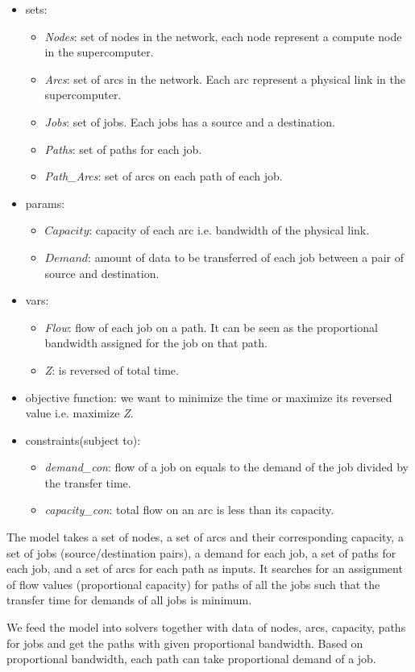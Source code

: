 \begin{itemize}
    \item sets: 
	\begin{itemize}
	    \item \textit{Nodes}: set of nodes in the network, each node represent a compute node in the supercomputer.
	    \item \textit{Arcs}: set of arcs in the network. Each arc represent a physical link in the supercomputer.
	    \item \textit{Jobs}: set of jobs. Each jobs has a source and a destination.
	    \item  \textit{Paths}: set of paths for each job.
	    \item \textit{Path\_Arcs}: set of arcs on each path of each job.
	\end{itemize}
    \item params: 
	\begin{itemize}
	    \item $Capacity$: capacity of each arc i.e. bandwidth of the physical link.
	    \item $Demand$: amount of data to be transferred of each job between a pair of source and destination.
	\end{itemize}
    \item vars:
	 \begin{itemize}
	    \item \textit{Flow}: flow of each job on a path. It can be seen as the proportional bandwidth assigned for the job on that path.
	    \item \textit{Z}: is reversed of total time.
	\end{itemize}
    \item objective function: we want to minimize the time or maximize its reversed value i.e. maximize \textit{Z}.
    \item constraints(subject to): 
	\begin{itemize}
	    \item \textit{demand\_con}: flow of a job on equals to the demand of the job divided by the transfer time.
	    \item \textit{capacity\_con}: total flow on an arc is less than its capacity.
	\end{itemize}
\end{itemize}

The model takes a set of nodes, a set of arcs and their corresponding capacity, a set of jobs (source/destination pairs), a demand for each job, a set of paths for each job, and a set of arcs for each path as inputs. It searches for an assignment of flow values (proportional capacity) for paths of all the jobs such that the transfer time for demands of all jobs is minimum.

We feed the model into solvers together with data of nodes, arcs, capacity, paths for jobs and get the paths with given proportional bandwidth. Based on proportional bandwidth, each path can take proportional demand of a job.

